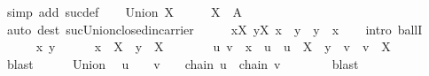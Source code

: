 \begin{isabellebody}
\ {\isacharparenleft}{\kern0pt}simp\ add{\isacharcolon}{\kern0pt}\ suc{\isacharunderscore}{\kern0pt}def{\isacharparenright}{\kern0pt}\isanewline
{}\isamarkupfalse%
\isanewline
\ \ \isamarkupfalse%
\ {\isacharparenleft}{\kern0pt}Union\ X{\isacharparenright}{\kern0pt}\isanewline
\ \ \isamarkupfalse%
\ \isamarkupfalse%
\ {\isachardoublequoteopen}{\isasymUnion}X\ {\isasymsubseteq}\ A{\isachardoublequoteclose}\isanewline
\ \ \ \ \isamarkupfalse%
\ {\isacharparenleft}{\kern0pt}auto\ dest{\isacharcolon}{\kern0pt}\ suc{\isacharunderscore}{\kern0pt}Union{\isacharunderscore}{\kern0pt}closed{\isacharunderscore}{\kern0pt}in{\isacharunderscore}{\kern0pt}carrier{\isacharparenright}{\kern0pt}\isanewline
\ \ \isamarkupfalse%
\ \isamarkupfalse%
\ {\isachardoublequoteopen}{\isasymforall}x{\isasymin}{\isasymUnion}X{\isachardot}{\kern0pt}\ {\isasymforall}y{\isasymin}{\isasymUnion}X{\isachardot}{\kern0pt}\ x\ {\isasymsqsubseteq}\ y\ {\isasymor}\ y\ {\isasymsqsubseteq}\ x{\isachardoublequoteclose}\isanewline
\ \ \isamarkupfalse%
\ {\isacharparenleft}{\kern0pt}intro\ ballI{\isacharparenright}{\kern0pt}\isanewline
\ \ \ \ \isamarkupfalse%
\ x\ y\isanewline
\ \ \ \ \isamarkupfalse%
\ {\isachardoublequoteopen}x\ {\isasymin}\ {\isasymUnion}X{\isachardoublequoteclose}\ \ {\isachardoublequoteopen}y\ {\isasymin}\ {\isasymUnion}X{\isachardoublequoteclose}\isanewline
\ \ \ \ \isamarkupfalse%
\ \isamarkupfalse%
\ u\ v\ \ {\isachardoublequoteopen}x\ {\isasymin}\ u{\isachardoublequoteclose}\ \ {\isachardoublequoteopen}u\ {\isasymin}\ X{\isachardoublequoteclose}\ \ {\isachardoublequoteopen}y\ {\isasymin}\ v{\isachardoublequoteclose}\ \ {\isachardoublequoteopen}v\ {\isasymin}\ X{\isachardoublequoteclose}\isanewline
\ \ \ \ \ \ \isamarkupfalse%
\ blast\isanewline
\ \ \ \ \isamarkupfalse%
\ Union\ \isamarkupfalse%
\ {\isachardoublequoteopen}u\ {\isasymin}\ {\isasymC}{\isachardoublequoteclose}\ \ {\isachardoublequoteopen}v\ {\isasymin}\ {\isasymC}{\isachardoublequoteclose}\ \ {\isachardoublequoteopen}chain\ u{\isachardoublequoteclose}\ \ {\isachardoublequoteopen}chain\ v{\isachardoublequoteclose}\isanewline
\ \ \ \ \ \ \isamarkupfalse%
\ blast{\isacharplus}{\kern0pt}\isanewline
\ \ \ \ \isamarkupfalse%

\end{isabellebody}

